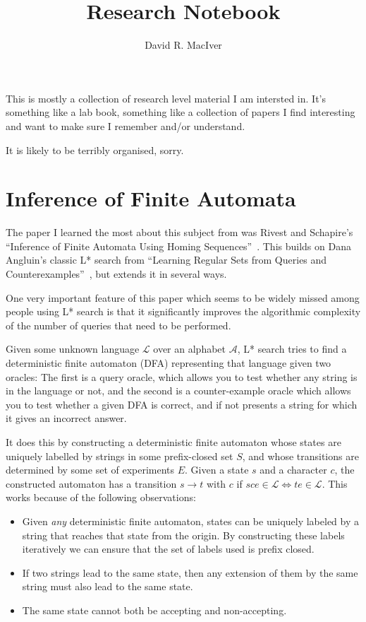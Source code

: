 \documentclass[a4paper]{article}
\title{Research Notebook}
\author{David R. MacIver}
\begin{document}
\maketitle

This is mostly a collection of research level material I am intersted in.
It's something like a lab book,
something like a collection of papers I find interesting and want to make sure I remember and/or understand.

It is likely to be terribly organised,
sorry.

\section{Inference of Finite Automata}

The paper I learned the most about this subject from was Rivest and Schapire's ``Inference of Finite Automata Using Homing Sequences''~\cite{DBLP:journals/iandc/RivestS93}.
This builds on Dana Angluin's classic L* search from ``Learning Regular Sets from Queries and Counterexamples''~\cite{DBLP:journals/iandc/Angluin87},
but extends it in several ways.

One very important feature of this paper which seems to be widely missed among people using L* search is that it significantly improves the algorithmic complexity of the number of queries that need to be performed.

Given some unknown language \(\mathcal{L}\) over an alphabet \(\mathcal{A}\),
L* search tries to find a deterministic finite automaton (DFA) representing that language given two oracles:
The first is a query oracle,
which allows you to test whether any string is in the language or not,
and the second is a counter-example oracle which allows you to test whether a given DFA is correct,
and if not presents a string for which it gives an incorrect answer.

It does this by constructing a deterministic finite automaton whose states are uniquely labelled by strings in some prefix-closed set \(S\),
and whose transitions are determined by some set of experiments \(E\).
Given a state \(s\) and a character \(c\),
the constructed automaton has a transition \(s \to t\) with \(c\) if \(sce \in \mathcal{L} \iff te \in \mathcal{L}\).
This works because of the following observations:

\begin{itemize}
\item Given \emph{any} deterministic finite automaton,
states can be uniquely labeled by a string that reaches that state from the origin.
By constructing these labels iteratively we can ensure that the set of labels used is prefix closed.
\item If two strings lead to the same state,
then any extension of them by the same string must also lead to the same state.
\item The same state cannot both be accepting and non-accepting.
\end{itemize}
\end{document}
